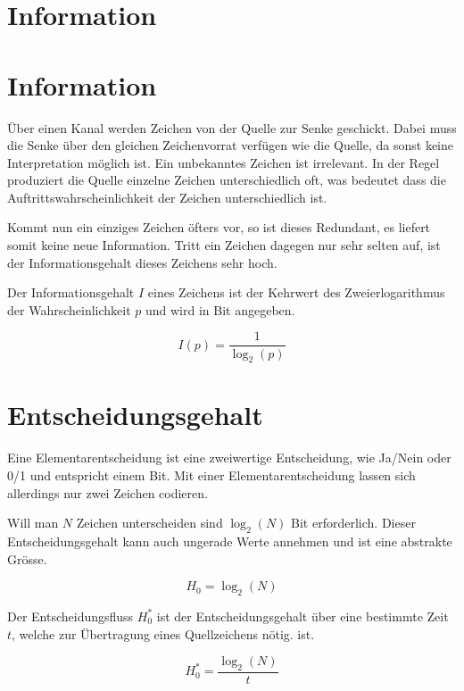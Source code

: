 \section{Information}


\section{Information}
 
Über einen Kanal werden Zeichen von der Quelle zur Senke geschickt. Dabei muss die Senke über den gleichen Zeichenvorrat verfügen wie die Quelle, da sonst keine Interpretation möglich ist. Ein unbekanntes Zeichen ist irrelevant. In der Regel produziert die Quelle einzelne Zeichen unterschiedlich oft, was bedeutet dass die Auftrittswahrscheinlichkeit der Zeichen unterschiedlich ist. 

Kommt nun ein einziges Zeichen öfters vor, so ist dieses Redundant, es liefert somit keine neue Information. Tritt ein Zeichen dagegen nur sehr selten auf, ist der Informationsgehalt dieses Zeichens sehr hoch. 

Der Informationsgehalt $I$ eines Zeichens ist der Kehrwert des Zweierlogarithmus der Wahrscheinlichkeit $p$ und wird in Bit angegeben.

\begin{displaymath}
I(p)=\frac{1}{\log_2(p)}
\end{displaymath}

\section{Entscheidungsgehalt}

Eine Elementarentscheidung ist eine zweiwertige Entscheidung, wie Ja/Nein oder 0/1 und entspricht einem Bit. Mit einer Elementarentscheidung lassen sich allerdings nur zwei Zeichen codieren. 

Will man $N$ Zeichen unterscheiden sind $\log_2(N)$ Bit erforderlich. Dieser Entscheidungsgehalt kann auch ungerade Werte annehmen und ist eine abstrakte Grösse.

\begin{displaymath}
H_0=\log_2(N)
\end{displaymath}

Der Entscheidungsfluss $H^*_0$ ist der Entscheidungsgehalt über eine bestimmte Zeit $t$, welche zur Übertragung eines Quellzeichens nötig. ist.

\begin{displaymath}
H^*_0=\frac{\log_2(N)}{t}
\end{displaymath}

